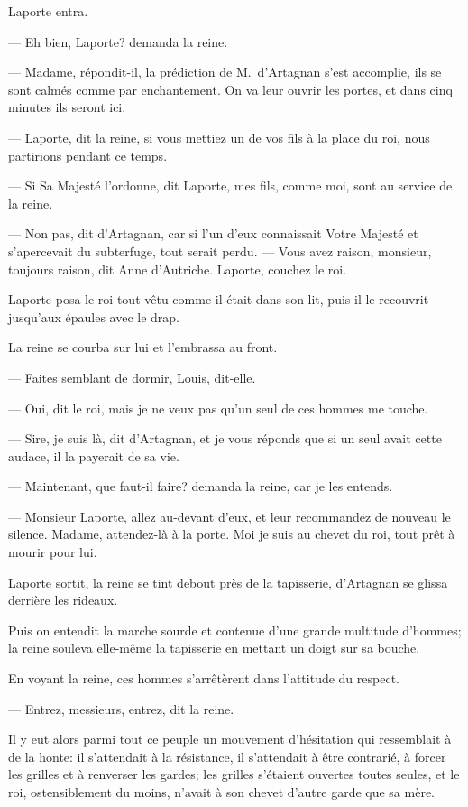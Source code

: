 Laporte entra.

— Eh bien, Laporte? demanda la reine.

— Madame, répondit-il, la prédiction de M.~d'Artagnan s'est accomplie, ils se sont calmés comme par enchantement. On va leur ouvrir les portes, et dans cinq minutes ils seront ici.

— Laporte, dit la reine, si vous mettiez un de vos fils à la place du roi, nous partirions pendant ce temps.

— Si Sa Majesté l'ordonne, dit Laporte, mes fils, comme moi, sont au service de la reine.

— Non pas, dit d'Artagnan, car si l'un d'eux connaissait Votre Majesté et s'apercevait du subterfuge, tout serait perdu.
— Vous avez raison, monsieur, toujours raison, dit Anne d'Autriche. Laporte, couchez le roi.

Laporte posa le roi tout vêtu comme il était dans son lit, puis il le recouvrit jusqu'aux épaules avec le drap.

La reine se courba sur lui et l'embrassa au front.

— Faites semblant de dormir, Louis, dit-elle.

— Oui, dit le roi, mais je ne veux pas qu'un seul de ces hommes me touche.

— Sire, je suis là, dit d'Artagnan, et je vous réponds que si un seul avait cette audace, il la payerait de sa vie.

— Maintenant, que faut-il faire? demanda la reine, car je les entends.

— Monsieur Laporte, allez au-devant d'eux, et leur recommandez de nouveau le silence. Madame, attendez-là à la porte. Moi je suis au chevet du roi, tout prêt à mourir pour lui.

Laporte sortit, la reine se tint debout près de la tapisserie, d'Artagnan se glissa derrière les rideaux.

Puis on entendit la marche sourde et contenue d'une grande multitude d'hommes; la reine souleva elle-même la tapisserie en mettant un doigt sur sa bouche.

En voyant la reine, ces hommes s'arrêtèrent dans l'attitude du respect.

— Entrez, messieurs, entrez, dit la reine.

Il y eut alors parmi tout ce peuple un mouvement d'hésitation qui ressemblait à de la honte: il s'attendait à la résistance, il s'attendait à être contrarié, à forcer les grilles et à renverser les gardes; les grilles s'étaient ouvertes toutes seules, et le roi, ostensiblement du moins, n'avait à son chevet d'autre garde que sa mère.

